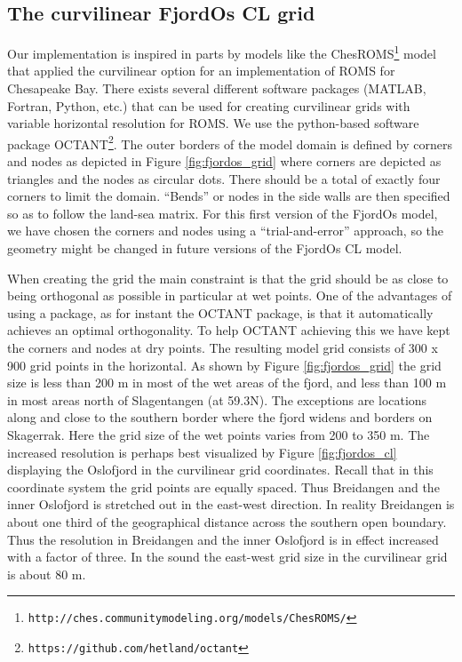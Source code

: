 \subsection{The curvilinear FjordOs CL grid}
Our implementation is inspired in parts by models like the ChesROMS\footnote{\texttt{http://ches.communitymodeling.org/models/ChesROMS/}} model that applied the curvilinear option for an implementation of ROMS for Chesapeake Bay. There exists several different software packages (MATLAB, Fortran, Python, etc.) that can be used for creating curvilinear grids with variable horizontal resolution for ROMS. We use the python-based software package OCTANT\footnote{\texttt{https://github.com/hetland/octant}}. The outer borders of the model domain is defined by corners and nodes as depicted in Figure \ref{fig:fjordos_grid} where corners are depicted as triangles and the nodes as circular dots. There should be a total of exactly four corners to limit the domain. ``Bends'' or nodes in the side walls are then specified so as to follow the land-sea matrix. For this first version of the FjordOs model, we have chosen the corners and nodes using a ``trial-and-error'' approach, so the geometry might be changed in future versions of the FjordOs CL model.

When creating the grid the main constraint is that the grid should be as close to being orthogonal as possible in particular at wet points. One of the advantages of using a package, as for instant the OCTANT package, is that it automatically achieves an optimal orthogonality. To help OCTANT achieving this we have kept the corners and nodes at dry points. The resulting model grid consists of 300 x 900 grid points in the horizontal. As shown by Figure \ref{fig:fjordos_grid} the grid size is less than 200 m in most of the wet areas of the fjord, and less than 100 m in most areas north of Slagentangen (at 59.3N). The exceptions are locations along and close to the southern border where the fjord widens and borders on Skagerrak. Here the grid size of the wet points varies from 200 to 350 m. The increased resolution is perhaps best visualized by Figure \ref{fig:fjordos_cl} displaying the Oslofjord in the curvilinear grid coordinates. Recall that in this coordinate system the grid points are equally spaced. Thus Breidangen and the inner Oslofjord is stretched out in the east-west direction. In reality Breidangen is about one third of the geographical distance across the southern open boundary. Thus the resolution in Breidangen and the inner Oslofjord is in effect increased with a factor of three. In the {\DR} sound the east-west grid size in the curvilinear grid is about 80 m.  



